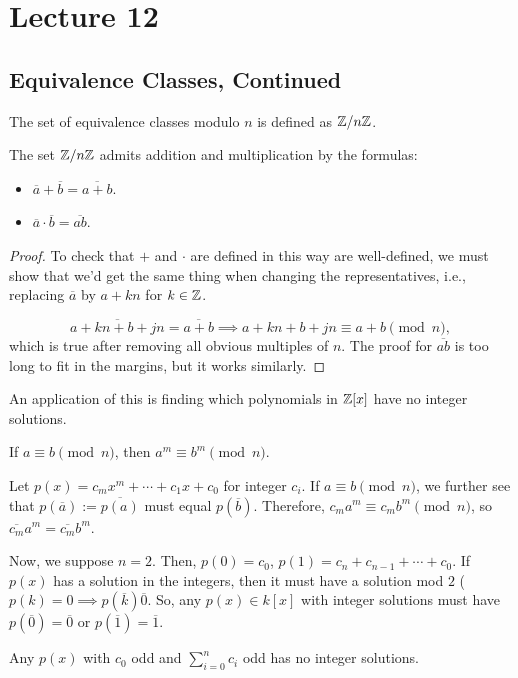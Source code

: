 \documentclass{article}
\begin{document}
\section{Lecture 12}
\subsection{Equivalence Classes, Continued}
The set of equivalence classes modulo $n$ is defined as $\mathbb Z / n\mathbb Z$. 

\begin{lemma}
	The set $\mathbb Z /n\mathbb Z$ admits addition and multiplication by the formulas:
	\begin{itemize}
		\item $\overline{a} + \overline{b} = \overline{a + b}$.
		\item $\overline{a} \cdot \overline{b} = \overline{ab}$.
	\end{itemize}
\end{lemma}

\begin{proof}
	To check that $+$ and $\cdot$ are defined in this way are well-defined, we must show that we'd get the same thing when changing the representatives, i.e., replacing $\overline a$ by $a + kn$ for $k \in \mathbb Z$. 

	\[\overline{a + kn + b + jn} = \overline{a + b} \implies a + kn + b + jn \equiv a + b \pmod n,\] which is true after removing all obvious multiples of $n$. The proof for $\overline{ab}$ is too long to fit in the margins, but it works similarly.
\end{proof}

An application of this is finding which polynomials in $\mathbb Z[x]$ have no integer solutions. 


\begin{remark}
	If $a \equiv b \pmod n$, then $a^m \equiv b^m \pmod n$.

	Let $p(x) = c_mx^m + \cdots + c_1x + c_0$ for integer $c_i$. If $a \equiv b \pmod n$, we further see that $p(\overline a) := \overline{p(a)}$ must equal $p(\overline b)$. Therefore, $c_ma^m \equiv c_mb^m \pmod n$, so $\overline{c_m}a^m = \overline{c_m}b^m$.
\end{remark}

Now, we suppose $n = 2$. Then, $p(0) = c_0$, $p(1) = c_n + c_{n-1} + \cdots + c_0$. If $p(x)$ has a solution in the integers, then it must have a solution mod $2$ ($p(k) = 0\implies p(\overline k)  \overline 0$. So, any $p(x) \in k[x]$ with integer solutions must have $p(\overline 0) = \overline 0$ or $p(\overline 1) = \overline 1$. 
\begin{proposition}
	Any $p(x)$ with $c_0$ odd and $\sum_{i = 0}^n c_i$ odd has no integer solutions. 
\end{proposition}
\end{document}
